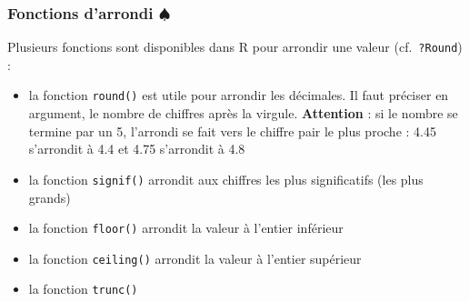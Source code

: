 \documentclass[
]{book}
\providecommand{\tightlist}{%
  \setlength{\itemsep}{0pt}\setlength{\parskip}{0pt}}
\begin{document}
\subsubsection{\texorpdfstring{Fonctions d'arrondi \(\spadesuit\)}{Fonctions d'arrondi \textbackslash spadesuit}}\label{fonctions-darrondi-spadesuit}

Plusieurs fonctions sont disponibles dans R pour arrondir une valeur (cf.~\texttt{?Round}) :

\begin{itemize}
\tightlist
\item
  la fonction \texttt{round()} est utile pour arrondir les décimales. Il faut préciser en argument, le nombre de chiffres après la virgule. \textbf{Attention} : si le nombre se termine par un 5, l'arrondi se fait vers le chiffre pair le plus proche : 4.45 s'arrondit à 4.4 et 4.75 s'arrondit à 4.8
\item
  la fonction \texttt{signif()} arrondit aux chiffres les plus significatifs (les plus grands)
\item
  la fonction \texttt{floor()} arrondit la valeur à l'entier inférieur
\item
  la fonction \texttt{ceiling()} arrondit la valeur à l'entier supérieur
\item
  la fonction \texttt{trunc()}
\end{itemize}
\end{document}
